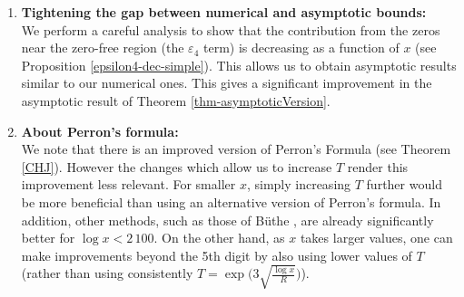 \documentclass[10pt]{amsart}
\theoremstyle{definition}
\numberwithin{equation}{section}
\begin{document}
\begin{enumerate}
 \item {\bf Tightening the gap between numerical and asymptotic bounds:}\\
 We perform a careful analysis to show that the contribution from the zeros near the zero-free region (the $\varepsilon_4$ term) is decreasing as a function of $x$ (see Proposition \ref{epsilon4-dec-simple}).
This allows us to obtain asymptotic results similar to our numerical  ones. This gives a significant improvement in the asymptotic result of Theorem \ref{thm-asymptoticVersion}.
 

 \item {\bf About Perron's formula:}\\
 We note that there is an improved version of Perron's Formula (see Theorem \ref{CHJ}).
 However the changes which allow us to increase $T$ render this improvement less relevant.
For smaller $x$, simply increasing $T$ further would be more beneficial than using an alternative version of Perron's formula. In addition, other methods, such as those of B{\"u}the \cite{Bu16, Bu18}, are already significantly better for $ \log x <2\,100$.
On the other hand, as $x$ takes larger values, one can make improvements beyond the 5th digit by also using lower values of $T$ (rather than using consistently $T=  \exp\big(3 \sqrt{\frac{ \log x}R} \big)$).
 \end{enumerate}
\end{document}
